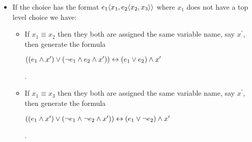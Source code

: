 \documentclass[12pt]{article}
\begin{document}
\begin{itemize}
\item If the choice has the format $\chc [\dimMeta_1] {x_1, \chc [\dimMeta_2] {x_2, x_3}} $ where $x_1$
does not have a top level choice we have:
\begin{itemize}
\item
If $x_1 \equiv x_2 $ then they both are assigned the same variable name, say $x^\prime$, then generate the formula\\
\centerline{$\left(\left(\dimMeta_1 \wedge x^\prime\right) \vee \left(\neg \dimMeta_1 \wedge \dimMeta_2 \wedge x^\prime\right)\right) \leftrightarrow \left(\dimMeta_1 \vee \dimMeta_2 \right) \wedge x^\prime$}.
\item
If $x_1 \equiv x_3 $ then they both are assigned the same variable name, say $x^\prime$, then generate the formula\\
\centerline{$\left(\left(\dimMeta_1 \wedge x^\prime\right) \vee \left(\neg \dimMeta_1 \wedge \neg \dimMeta_2 \wedge x^\prime\right)\right) \leftrightarrow \left(\dimMeta_1 \vee \neg \dimMeta_2 \right) \wedge x^\prime$}.\end{itemize}


\end{itemize}
\end{document}
